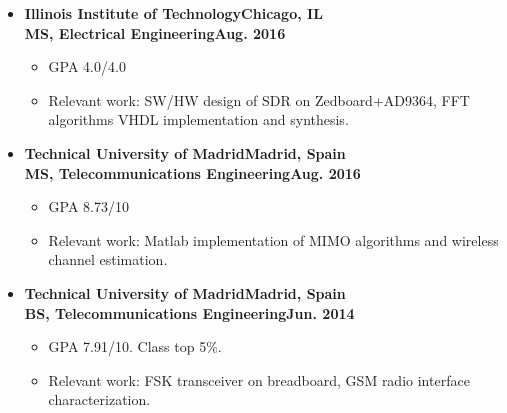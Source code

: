\documentclass[10pt, letterpaper]{letter}
\begin{document}
\begin{itemize}[label=$\bullet$, leftmargin=1em]

    \item
    \textbf{Illinois Institute of Technology\hfill Chicago, IL}\vspace{2pt}\\
    \textbf{MS, Electrical Engineering\hfill Aug. 2016}\vspace{2pt}
    \begin{itemize}[nosep, leftmargin=1.15em]
	\item GPA 4.0/4.0
	\item Relevant work: SW/HW design of SDR on Zedboard+AD9364, FFT algorithms VHDL implementation and synthesis.
    \end{itemize}

\vfill

    \item
    \textbf{Technical University of Madrid\hfill Madrid, Spain}\vspace{2pt}\\
    \textbf{MS, Telecommunications Engineering\hfill Aug. 2016}\vspace{2pt}
    \begin{itemize}[nosep, leftmargin=1.15em]
	\item GPA 8.73/10
	\item Relevant work: Matlab implementation of MIMO algorithms and wireless channel estimation.
    \end{itemize}

\vfill

    \item
    \textbf{Technical University of Madrid\hfill Madrid, Spain\vspace{2pt}}\\
    \textbf{BS, Telecommunications Engineering\hfill Jun. 2014}\vspace{2pt}
    \begin{itemize}[nosep, leftmargin=1.15em]
    	\item GPA 7.91/10. Class top 5\%.
	\item Relevant work: FSK transceiver on breadboard, GSM radio interface characterization.
    \end{itemize}

\end{itemize}

\vfill

\end{document}
